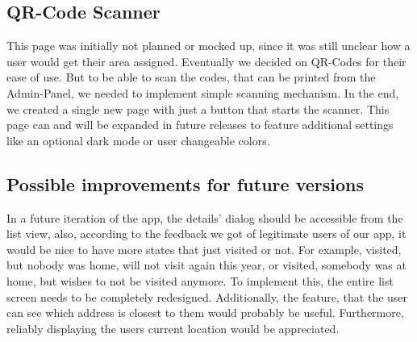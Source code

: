 \subsection{QR-Code Scanner}
This page was initially not planned or mocked up, since it was still unclear how a user would get their area assigned. Eventually we decided on QR-Codes for their ease of use. But to be able to scan the codes, that can be printed from the Admin-Panel, we needed to implement simple scanning mechanism. In the end, we created a single new page with just a button that starts the scanner. This page can and will be expanded in future releases to feature additional settings like an optional dark mode or user changeable colors. 

\subsection{Possible improvements for future versions}

In a future iteration of the app, the details' dialog should be accessible from the list view, also, according to the feedback we got of legitimate users of our app, it would be nice to have more states that just visited or not. For example, visited, but nobody was home, will not visit again this year, or visited, somebody was at home, but wishes to not be visited anymore. To implement this, the entire list screen needs to be completely redesigned. Additionally, the feature, that the user can see which address is closest to them would probably be useful. Furthermore, reliably displaying the users current location would be appreciated.

\newpage